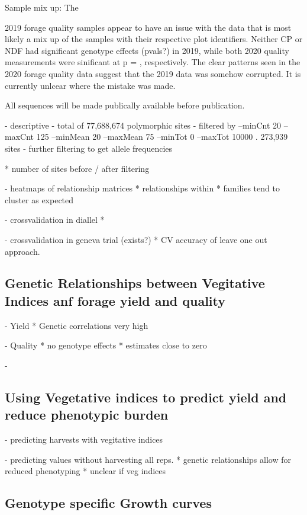 \documentclass[12pt, letterpaper]{article}
\begin{document}
Sample mix up: The 

2019 forage quality samples appear to have an issue with the data that is most likely a mix up of the samples with their respective plot  identifiers. Neither CP or NDF had significant genotype effects (pvals?) in 2019, while both 2020 quality measurements were sinificant at p =  , respectively. The clear patterns seen in the 2020 forage quality data suggest that the 2019 data was somehow corrupted. It is currently unlcear where the mistake was made. 


	All sequences will be made publically available before publication. 

- descriptive
	- total of 77,688,674 polymorphic sites
	- filtered by --minCnt 20 --maxCnt 125 --minMean 20 --maxMean 75 --minTot 0 --maxTot 10000
		. 273,939 sites
	- further filtering to get allele frequencies 

	* number of sites before / after filtering

- heatmaps of relationship matrices
	* relationships within
	* families tend to cluster as expected

- crossvalidation in diallel
	* 

- crossvalidation in geneva trial (exists?)
	* CV accuracy of leave one out approach. 

\subsection{Genetic Relationships between Vegitative Indices anf forage yield and quality}	

- Yield
	* Genetic correlations very high

- Quality
	* no genotype effects
	* estimates close to zero

- 

\subsection{Using Vegetative indices to predict yield and reduce phenotypic burden}

- predicting harvests with vegitative indices

- predicting values without harvesting all reps. 
	* genetic relationships allow for reduced phenotyping
	* unclear if veg indices 

\subsection{Genotype specific Growth curves}
\end{document}
